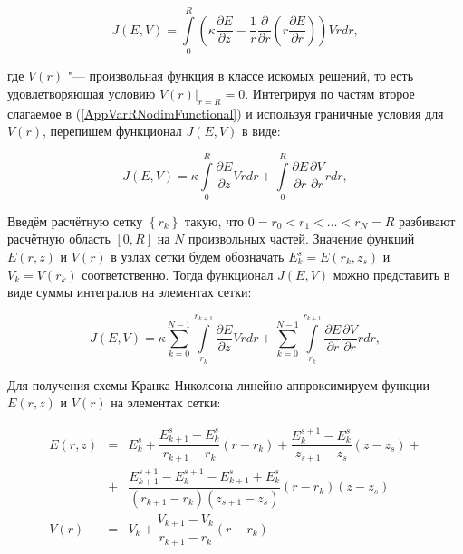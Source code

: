 \begin{equation}\label{AppVarRNodimFunctional}
J(E, V) = \int\limits_{0}^{R} \left(\kappa\dfrac{\partial E}{\partial z} -
          \dfrac{1}{r}\dfrac{\partial}{\partial r}\left(r \dfrac{\partial E}{\partial r}\right)\right) V r dr,
\end{equation}

\noindent где $V(r)$ "--- произвольная функция в классе искомых решений, то есть удовлетворяющая условию $\left. V(r)\right|_{r = R} = 0$.
Интегрируя по частям второе слагаемое в (\ref{AppVarRNodimFunctional}) и используя граничные условия для $V(r)$,
перепишем функционал $J(E, V)$ в виде:

\begin{equation}
J(E, V) = \kappa \int\limits_{0}^{R} \dfrac{\partial E}{\partial z} V r dr +
          \int\limits_{0}^{R}\dfrac{\partial E}{\partial r}\dfrac{\partial V}{\partial r} r dr,
\end{equation}

Введём расчётную сетку $\left\{ r_k \right\}$ такую, что $0 = r_0 < r_1 < \ldots < r_N = R$ разбивают
расчётную область $\left[0, R\right]$ на $N$ произвольных частей. Значение функций $E(r, z)$ и $V(r)$
в узлах сетки будем обозначать $E_k^s = E(r_k, z_s)$ и $V_k = V(r_k)$ соответственно. Тогда функционал
$J(E, V)$ можно представить в виде суммы интегралов на элементах сетки:

\begin{equation}\label{AppVarRNodimSum}
J(E, V) = \kappa \sum\limits_{k=0}^{N-1} \int\limits_{r_k}^{r_{k+1}} \dfrac{\partial E}{\partial z} V r dr +
          \sum\limits_{k=0}^{N-1} \int\limits_{r_k}^{r_{k+1}}\dfrac{\partial E}{\partial r}\dfrac{\partial V}{\partial r} r dr,
\end{equation}

Для получения схемы Кранка-Николсона линейно аппроксимируем функции $E(r, z)$ и $V(r)$ на элементах сетки:

\begin{equation}
	\begin{array}{lll}
		E(r, z) & = & E_k^s + \dfrac{E_{k+1}^s-E_k^s}{r_{k+1}-r_k}(r-r_k) + \dfrac{E_k^{s+1}-E_k^s}{z_{s+1}-z_s}(z-z_s) + \\[1em]
		        & + & \dfrac{E_{k+1}^{s+1}-E_k^{s+1}-E_{k+1}^s+E_k^s}{(r_{k+1}-r_k)(z_{s+1}-z_s)}(r-r_k)(z-z_s) \\[1em]

		   V(r) & = & V_k + \dfrac{V_{k+1}-V_k}{r_{k+1}-r_k}(r-r_k)
	\end{array}
\end{equation}

